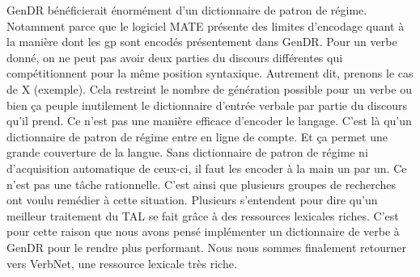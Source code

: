 GenDR bénéficierait énormément d'un dictionnaire de patron de régime. Notamment parce que le logiciel MATE présente des limites d'encodage quant à la manière dont les gp sont encodés présentement dans GenDR. Pour un verbe donné, on ne peut pas avoir deux parties du discours différentes qui compétitionnent pour la même position syntaxique. Autrement dit, prenons le cas de X (exemple). Cela restreint le nombre de génération possible pour un verbe ou bien ça peuple inutilement le dictionnaire d'entrée verbale par partie du discours qu'il prend. Ce n'est pas une manière efficace d'encoder le langage. C'est là qu'un dictionnaire de patron de régime entre en ligne de compte. Et ça permet une grande couverture de la langue. Sans dictionnaire de patron de régime ni d'acquisition automatique de ceux-ci, il faut les encoder à la main un par un. Ce n'est pas une tâche rationnelle. C'est ainsi que plusieurs groupes de recherches ont voulu remédier à cette situation. Plusieurs s'entendent pour dire qu'un meilleur traitement du \ac{TAL} se fait grâce à des ressources lexicales riches. C'est pour cette raison que nous avons pensé implémenter un dictionnaire de verbe à GenDR pour le rendre plus performant. Nous nous sommes finalement retourner vers VerbNet, une ressource lexicale très riche.
